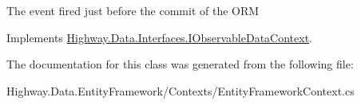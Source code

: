 The event fired just before the commit of the O\-R\-M 



Implements \hyperlink{interface_highway_1_1_data_1_1_interfaces_1_1_i_observable_data_context_add85ecbc05ebf7174003841bdbd72dfe}{Highway.\-Data.\-Interfaces.\-I\-Observable\-Data\-Context}.



The documentation for this class was generated from the following file\-:\begin{DoxyCompactItemize}
\item 
Highway.\-Data.\-Entity\-Framework/\-Contexts/Entity\-Framework\-Context.\-cs\end{DoxyCompactItemize}
